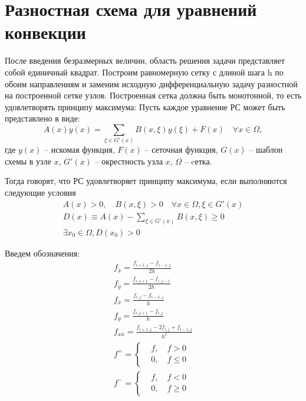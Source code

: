 \documentclass[a4paper, 12pt]{article}
\begin{document}
  \section{Разностная схема для уравнений конвекции}
    После введения безразмерных величин, область решения задачи представляет
    собой единичный квадрат. Построим равномерную сетку с длиной шага h по обоим
    направлениям и заменим исходную дифференциальную задачу разностной на
    построенной сетке узлов. Построенная сетка должна быть монотонной, то есть
    удовлетворять принципу максимума:
    \bigskip
    Пусть каждое уравнение РС может быть представлено в виде:
    \begin{equation}
      A(x) y(x) = \sum\limits_{\xi \in G'(x)} B(x,\xi)y(\xi) + F(x) \quad
        \forall x \in \Omega,\label{max_principle}
    \end{equation}
    где $y(x)$ -- искомая функция, $F(x)$ -- сеточная функция, $G(x)$ --
    шаблон схемы в узле $x$, $G'(x)$ -- окрестность узла $x$, $\Omega$ -- cетка.

    Тогда говорят, что РС удовлетворяет принципу максимума, если выполняются
    следующие условия
    \begin{gather*}
      A(x) > 0, \quad B(x,\xi) > 0 \quad \forall x \in \Omega, \xi \in G'(x)
      \\
      D(x) \equiv A(x)- \sum\limits_{\xi \in G'(x)} B(x,\xi) \geq 0
      \\
      \exists x_0 \in \Omega, D(x_0) > 0
    \end{gather*}

    Введем обозначения:
    \begin{gather*}
      f_{\mathring{x}} = \frac{f_{i+1,j} - f_{i-1,j}}{2 h}
      \\
      f_{\mathring{y}} = \frac{f_{i,j+1} - f_{i,j-1}}{2 h}
      \\
      f_{\overline{x}} = \frac{f_{i,j} - f_{i-1,j}}{h}
      \\
      f_{y} = \frac{f_{i,j+1} - f_{i,j}}{h}
      \\
      f_{x \overline{x}} = \frac{f_{i+1,j} - 2 f_{i,j} + f_{i-1,j}}{h^2}
      \\
      f^{+} = \left\{
        \begin{aligned}
          &f, \quad f > 0\\
          &0, \quad f \leq 0
        \end{aligned}
      \right.
      \\
      f^{-} = \left\{
        \begin{aligned}
          &f, \quad f < 0\\
          &0, \quad f \geq 0
        \end{aligned}
      \right.
    \end{gather*}
\end{document}
